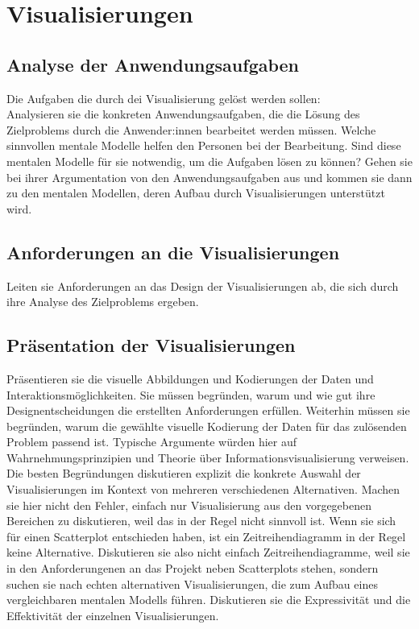 \documentclass[usegeometry=true]{scrartcl}
\begin{document}
\section{Visualisierungen}
\subsection{Analyse der Anwendungsaufgaben}
Die Aufgaben die durch dei Visualisierung gelöst werden sollen: \\

Analysieren sie die konkreten Anwendungsaufgaben, die die Lösung des Zielproblems durch die Anwender:innen bearbeitet werden müssen. 
Welche sinnvollen mentale Modelle helfen den Personen bei der Bearbeitung. 
Sind diese mentalen Modelle für sie notwendig, um die Aufgaben lösen zu können? Gehen sie bei ihrer Argumentation von den Anwendungsaufgaben aus und kommen sie dann zu den mentalen Modellen, deren Aufbau durch Visualisierungen unterstützt wird. 
\subsection{Anforderungen an die Visualisierungen}
Leiten sie Anforderungen an das Design der Visualisierungen ab, die sich durch ihre Analyse des Zielproblems ergeben.
\subsection{Präsentation der Visualisierungen}
Präsentieren sie die visuelle Abbildungen und Kodierungen der Daten und Interaktionsmöglichkeiten. 
Sie müssen  begründen, warum und wie gut ihre Designentscheidungen die erstellten Anforderungen erfüllen. 
Weiterhin müssen sie begründen, warum die gewählte visuelle Kodierung der Daten für das zulösenden Problem passend ist.
Typische Argumente würden hier auf Wahrnehmungsprinzipien und Theorie über Informationsvisualisierung verweisen. 
Die besten Begründungen diskutieren explizit die konkrete Auswahl der Visualisierungen im Kontext von mehreren verschiedenen Alternativen. 
Machen sie hier nicht den Fehler, einfach nur Visualisierung aus den vorgegebenen Bereichen zu diskutieren, weil das in der Regel nicht sinnvoll ist.
Wenn sie sich für einen Scatterplot entschieden haben, ist ein Zeitreihendiagramm in der Regel keine Alternative.
Diskutieren sie also nicht einfach Zeitreihendiagramme, weil sie in den Anforderungenen an das Projekt neben Scatterplots stehen, sondern suchen sie nach echten alternativen Visualisierungen, die zum Aufbau eines vergleichbaren mentalen Modells führen. 
Diskutieren sie die Expressivität und die Effektivität der einzelnen Visualisierungen. 
\end{document}
